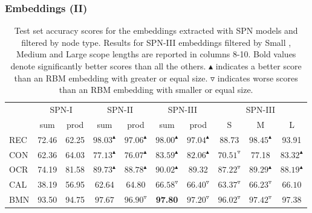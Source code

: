 \documentclass[10pt, t, xcolor={usenames,dvipsnames,svgnames}, compress]{beamer}
\begin{document}
\begin{frame}
  \frametitle{Embeddings (II)}
  \begin{table}[!t]
    \centering
    \footnotesize
    \caption[datasets]{Test set accuracy scores for the embeddings
      extracted with \textsf{SPN} models and filtered by node
      type. Results for \textsf{SPN-III} embeddings filtered by \textsf{S}mall
      , \textsf{M}edium and \textsf{L}arge scope
      lengths are reported in columns 8-10.
      Bold values denote significantly better scores than all the others.
      $\blacktriangle$ indicates a better score than an RBM embedding
      with greater or equal size. $\triangledown$ indicates worse
      scores than an RBM embedding with smaller or equal size.}
    \setlength{\tabcolsep}{3pt}  
    \begin{tabular}{l c c c c c c | c c c}
      \toprule
      & \multicolumn{2}{c}{\textsf{SPN-I}} &
                                             \multicolumn{2}{c}{\textsf{SPN-II}}
      & \multicolumn{2}{c}{\textsf{SPN-III}} & \multicolumn{3}{c}{\textsf{SPN-III}}\\
      
      &sum  & prod& sum& prod& sum& prod & \textsf{S} & \textsf{M} & \textsf{L}\\
      \midrule
      \textsf{REC} & 72.46& 62.25& $\mathbf{98.03}^{\blacktriangle}$& $97.06^{\blacktriangle}$& $\mathbf{98.00}^{\blacktriangle}$& $97.04^{\blacktriangle}$ & 88.73&$\mathbf{98.45}^{\blacktriangle}$& 93.91\\
      \midrule
      \textsf{CON} & 62.36& 64.03& $77.13^{\blacktriangle}$& $76.07^{\blacktriangle}$& $\mathbf{83.59}^{\blacktriangle}$& $82.06^{\blacktriangle}$ &$70.51^{\triangledown}$&77.18&$\mathbf{83.32}^{\blacktriangle}$\\
      \midrule
      \textsf{OCR} & 74.19& 81.58& $89.73^{\blacktriangle}$& $88.78^{\blacktriangle}$& $\mathbf{90.02}^{\blacktriangle}$& 89.32 & $87.22^{\triangledown}$& $\mathbf{89.29}^{\blacktriangle}$& $88.19^{\blacktriangle}$\\
      \midrule
      \textsf{CAL} & 38.19& 56.95& 62.64& 64.80& $\mathbf{66.58}^{\triangledown}$& $66.40^{\triangledown}$& $63.37^{\triangledown}$& $\mathbf{66.23}^{\triangledown}$& $66.10$\\
      \midrule
      \textsf{BMN} & 93.50& 94.75& $97.67$& $96.90^{\triangledown}$& \textbf{97.80}& $97.20^{\triangledown}$ & $96.02^{\triangledown}$& $\mathbf{97.42^{\triangledown}}$& 97.38\\
      \bottomrule
    \end{tabular}
    \label{tab:model-filter-accs}
  \end{table}
\end{frame}
\end{document}
